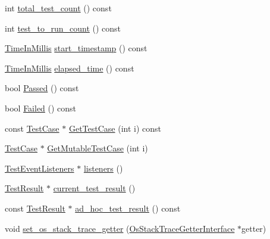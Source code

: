 \begin{DoxyCompactItemize}
\item 
int \hyperlink{classtesting_1_1internal_1_1_unit_test_impl_a61963ef3fbfe6110170abcb6f4368834}{total\-\_\-test\-\_\-count} () const 
\item 
int \hyperlink{classtesting_1_1internal_1_1_unit_test_impl_aac2aed3bb9f2aa77c43705a9d6dc1849}{test\-\_\-to\-\_\-run\-\_\-count} () const 
\item 
\hyperlink{namespacetesting_1_1internal_a5eed833eddf9ea8ca45546c125f4ef0c}{Time\-In\-Millis} \hyperlink{classtesting_1_1internal_1_1_unit_test_impl_acdad9bf7850c7697587b501be5c49f32}{start\-\_\-timestamp} () const 
\item 
\hyperlink{namespacetesting_1_1internal_a5eed833eddf9ea8ca45546c125f4ef0c}{Time\-In\-Millis} \hyperlink{classtesting_1_1internal_1_1_unit_test_impl_a0ae726d47c69dd85b4f7858e78368bcb}{elapsed\-\_\-time} () const 
\item 
bool \hyperlink{classtesting_1_1internal_1_1_unit_test_impl_aca57d4b475d7b9ad49f061197124c183}{Passed} () const 
\item 
bool \hyperlink{classtesting_1_1internal_1_1_unit_test_impl_aba1461219cf740bcb2525bd85b504838}{Failed} () const 
\item 
const \hyperlink{classtesting_1_1_test_case}{Test\-Case} $\ast$ \hyperlink{classtesting_1_1internal_1_1_unit_test_impl_a3104213167a38ffa80168a888e769c20}{Get\-Test\-Case} (int i) const 
\item 
\hyperlink{classtesting_1_1_test_case}{Test\-Case} $\ast$ \hyperlink{classtesting_1_1internal_1_1_unit_test_impl_a2ca71a08060037357fc7e1a406b89add}{Get\-Mutable\-Test\-Case} (int i)
\item 
\hyperlink{classtesting_1_1_test_event_listeners}{Test\-Event\-Listeners} $\ast$ \hyperlink{classtesting_1_1internal_1_1_unit_test_impl_a67211f8475936f88d0e4d30f841c0da4}{listeners} ()
\item 
\hyperlink{classtesting_1_1_test_result}{Test\-Result} $\ast$ \hyperlink{classtesting_1_1internal_1_1_unit_test_impl_a6f7b5fe51daaf76c4f3095ff7fce4910}{current\-\_\-test\-\_\-result} ()
\item 
const \hyperlink{classtesting_1_1_test_result}{Test\-Result} $\ast$ \hyperlink{classtesting_1_1internal_1_1_unit_test_impl_aa5c0533805fa2937c58d6805e20aac51}{ad\-\_\-hoc\-\_\-test\-\_\-result} () const 
\item 
void \hyperlink{classtesting_1_1internal_1_1_unit_test_impl_a3306f7d2b19bca54b841006e4a2e0260}{set\-\_\-os\-\_\-stack\-\_\-trace\-\_\-getter} (\hyperlink{classtesting_1_1internal_1_1_os_stack_trace_getter_interface}{Os\-Stack\-Trace\-Getter\-Interface} $\ast$getter)

\end{DoxyCompactItemize}
